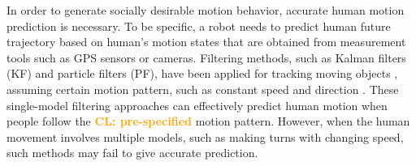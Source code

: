 \documentclass[journal]{IEEEtran}
\newcommand{\todonote}[1]{\vspace{0px} %
	\todo[inline, color=green!30]{\textbf{[Note:]} {#1}} %
}
\newcommand{\todohere}[1]{\hl{(\textbf{TODO:} #1)}}
\DeclareRobustCommand{\clnote}[1]{\ifthenelse{\boolean{include-notes}}%
	{\textcolor{orange}{\textbf{CL: #1}}}{}}
\begin{document}
	In order to generate socially desirable motion behavior, accurate human motion prediction is necessary.
	To be specific, a robot needs to predict human future trajectory based on human's motion states that are obtained from measurement tools such as GPS sensors or cameras.
	Filtering methods, such as Kalman filters (KF) and particle filters (PF), have been applied for tracking moving objects \cite {koller1994robust,rui2001better}, assuming certain motion pattern, such as constant speed and direction \cite{svenstrup2010trajectory}. %
	These single-model filtering approaches can effectively predict human motion when people follow the \clnote{pre-specified} motion pattern.
	However, when the human movement involves multiple models, such as making turns with changing speed, such methods may fail to give accurate prediction.
	
	
\end{document}
